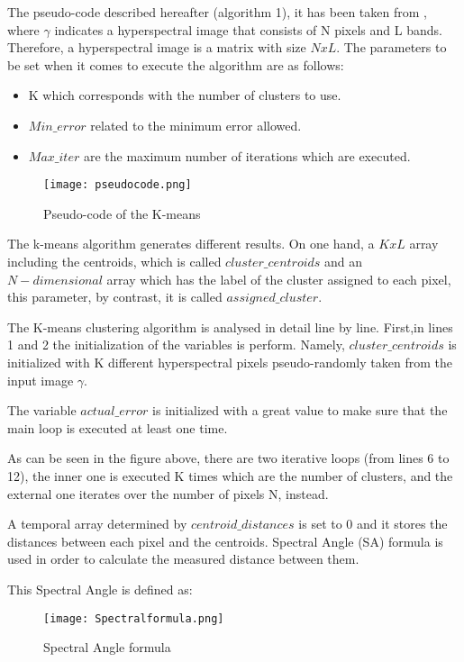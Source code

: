 The pseudo-code described hereafter (algorithm 1), it has been taken from \cite{torti2018paralle}, where $\gamma$ indicates a hyperspectral image that consists of N pixels and L bands. Therefore, a hyperspectral image is a matrix with size $NxL$. The parameters to be set when it comes to execute the algorithm are as follows: 
\begin{itemize}
\item K which corresponds with the number of clusters to use.
\item $Min\_error$ related to the minimum error allowed.
\item $Max\_iter$ are the maximum number of iterations which are executed.
\end{itemize}

 \begin{figure}[H]
        \texttt{[image: pseudocode.png]} 
        \centering   
        \caption{Pseudo-code of the K-means   \cite{torti2018paralle}}        
        \label{fig:systemArch}
    \end{figure}

The k-means algorithm generates different results. On one hand, a $KxL$ array including the centroids, which is called $cluster\_centroids$ and an $N-dimensional$ array which has the label of the cluster assigned to each pixel, this parameter, by contrast, it is called $assigned\_cluster$.

The K-means clustering algorithm is analysed in detail line by line. First,in lines 1 and 2 the initialization of the variables is perform. Namely,
$cluster\_centroids$ is initialized with K different hyperspectral pixels pseudo-randomly taken from the input image $\gamma$.

 The variable $actual\_error$ is initialized with a great value to make sure that the main loop is executed at least one time.
 
 As can be seen in the figure above, there are two iterative loops (from lines 6 to 12), the inner one is executed K times which are the number of clusters, and the external one iterates over the number of pixels N, instead. 
 
  A temporal array determined by $centroid\_distances$ is set to 0 and it stores the distances between each pixel and the centroids. Spectral Angle (SA) formula is used in order to calculate the measured distance between them.
  
  This Spectral Angle is defined as: 
 
   \begin{figure}[H]
        \texttt{[image: Spectralformula.png]} 
        \centering  
        \caption{Spectral Angle formula\cite{torti2018paralle}}          
        \label{fig:systemArch}
    \end{figure}
   
